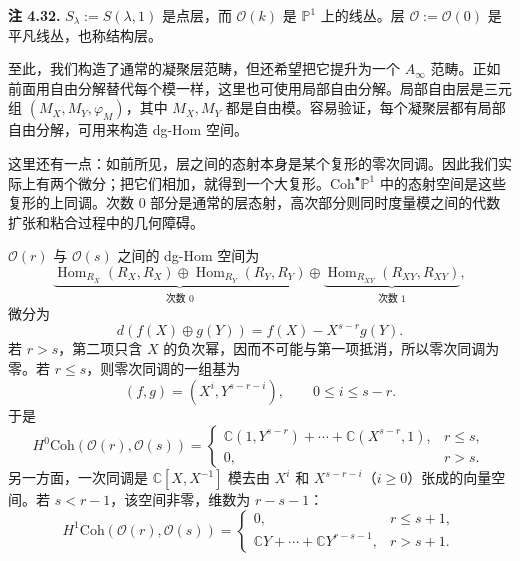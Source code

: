 \begin{note}\label{note:projective-line-sheaves}
\textbf{注 4.32.} $S_\lambda:=S(\lambda,1)$ 是点层，而 $\mathcal O(k)$ 是 $\mathbb P^1$ 上的线丛。层 $\mathcal O:=\mathcal O(0)$ 是平凡线丛，也称结构层。
\end{note}

至此，我们构造了通常的凝聚层范畴，但还希望把它提升为一个 $A_\infty$ 范畴。正如前面用自由分解替代每个模一样，这里也可使用局部自由分解。局部自由层是三元组 $(M_X,M_Y,\varphi_M)$，其中 $M_X,M_Y$ 都是自由模。容易验证，每个凝聚层都有局部自由分解，可用来构造 dg-Hom 空间。

这里还有一点：如前所见，层之间的态射本身是某个复形的零次同调。因此我们实际上有两个微分；把它们相加，就得到一个大复形。$\mathrm{Coh}^\bullet\mathbb P^1$ 中的态射空间是这些复形的上同调。次数 $0$ 部分是通常的层态射，高次部分则同时度量模之间的代数扩张和粘合过程中的几何障碍。

\begin{example}\label{ex:dg-hom-line-bundles}
$\mathcal O(r)$ 与 $\mathcal O(s)$ 之间的 dg-Hom 空间为
\[
\underbrace{\operatorname{Hom}_{R_X}(R_X,R_X)
\oplus\operatorname{Hom}_{R_Y}(R_Y,R_Y)}_{\text{次数 }0}
\oplus
\underbrace{\operatorname{Hom}_{R_{XY}}(R_{XY},R_{XY})}_{\text{次数 }1},
\]
微分为
\[
  d(f(X)\oplus g(Y))=f(X)-X^{s-r}g(Y).
\]
若 $r>s$，第二项只含 $X$ 的负次幂，因而不可能与第一项抵消，所以零次同调为零。若 $r\leq s$，则零次同调的一组基为
\[
  (f,g)=(X^i,Y^{s-r-i}),\qquad 0\leq i\leq s-r.
\]
于是
\[
  H^0\mathrm{Coh}(\mathcal O(r),\mathcal O(s))=
  \begin{cases}
    \mathbb C(1,Y^{s-r})+\cdots+\mathbb C(X^{s-r},1),&r\leq s,\\
    0,&r>s.
  \end{cases}
\]
另一方面，一次同调是 $\mathbb C[X,X^{-1}]$ 模去由 $X^i$ 和 $X^{s-r-i}$（$i\geq0$）张成的向量空间。若 $s<r-1$，该空间非零，维数为 $r-s-1$：
\[
  H^1\mathrm{Coh}(\mathcal O(r),\mathcal O(s))=
  \begin{cases}
    0,&r\leq s+1,\\
    \mathbb CY+\cdots+\mathbb CY^{r-s-1},&r>s+1.
  \end{cases}
\]
\end{example}

